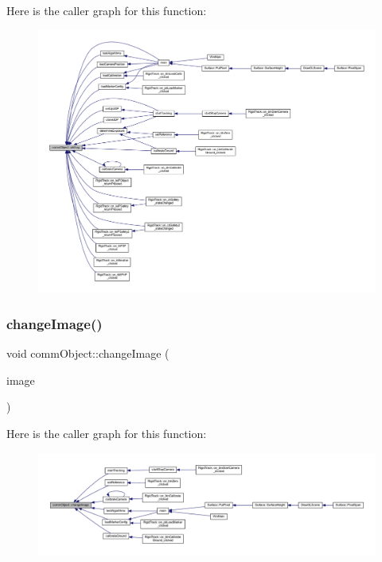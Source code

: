 Here is the caller graph for this function\+:
\nopagebreak
\begin{figure}[H]
\begin{center}
\leavevmode
\includegraphics[width=350pt]{classcomm_object_aec354c7099b3039083cc4224e071e022_icgraph}
\end{center}
\end{figure}
\mbox{\label{classcomm_object_a6f81522c2aa1668fa402f08710e6206b}} 
\subsubsection{\texorpdfstring{change\+Image()}{changeImage()}}
{\footnotesize\ttfamily void comm\+Object\+::change\+Image (\begin{DoxyParamCaption}\item[{Q\+Pixmap}]{image }\end{DoxyParamCaption})}

Here is the caller graph for this function\+:
\nopagebreak
\begin{figure}[H]
\begin{center}
\leavevmode
\includegraphics[width=350pt]{classcomm_object_a6f81522c2aa1668fa402f08710e6206b_icgraph}
\end{center}
\end{figure}
\mbox{\label{classcomm_object_a1f4b8dd22ecc46bab619f6b1fe1a5144}} 

